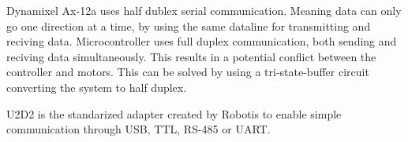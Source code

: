 
Dynamixel Ax-12a uses half dublex serial communication. Meaning data can only go one direction at a time, by using the same dataline for transmitting and reciving data.
Microcontroller uses full duplex communication, both sending and reciving data simultaneously. This results in a potential conflict between the controller and motors.
This can be solved  by using a tri-state-buffer circuit converting the system to half duplex. 









U2D2 is the standarized adapter created by Robotis to enable simple communication through USB, TTL, RS-485 or UART.  
